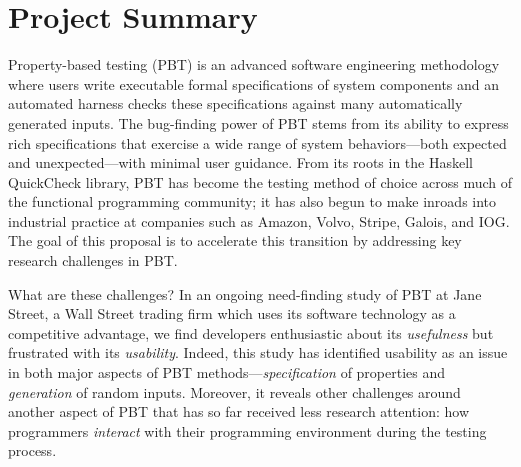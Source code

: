 \section*{Project Summary}


\newcommand{\summarysection}[1]{\medskip \noindent {\bf #1.}}

\summarysection{Overview}
Property-based testing (PBT) is an advanced software engineering
methodology where users write executable formal specifications of system
components
and an automated harness checks these specifications against
many automatically generated inputs.  The bug-finding power of PBT
stems from its ability to express rich specifications that
exercise a wide range of system behaviors---both
expected and unexpected---with minimal user guidance.
%
From its roots in the Haskell QuickCheck library, PBT has become
the testing method of choice across much of the functional programming
community; it has also begun to make inroads into industrial practice
at companies such as Amazon, Volvo, Stripe, Galois, and IOG.
%
The goal of this proposal is to accelerate this transition
by addressing key research challenges in
PBT.

What are these challenges? 
In an ongoing need-finding study of PBT at Jane
Street, a Wall Street trading firm which uses its software
technology as a competitive advantage, we find developers enthusiastic
about its {\em usefulness} but frustrated with its {\em usability}.
%
Indeed, this study has identified usability as an issue in both major aspects
of PBT methods---{\em specification} of properties and {\em
  generation} of random inputs. Moreover, it reveals other challenges
around another aspect of PBT that has so far received less research
attention: how programmers {\em interact} with their programming
environment during the testing process.


